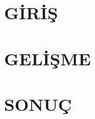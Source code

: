 \documentclass[12pt,a4paper]{article} %
\begin{document}

\setlength\parindent{1cm}




\setlength\parindent{0cm}

\section{GİRİŞ}
\blindtext
\clearpage

\section{GELİŞME}
\blindtext
\clearpage

\section{SONUÇ}
\blindtext
\end{document}
